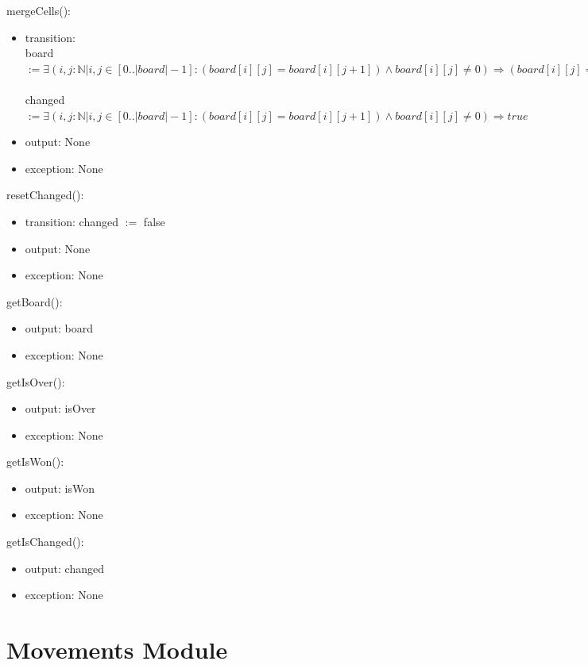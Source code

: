\documentclass[12pt]{article}
\begin{document}
\noindent mergeCells():
\begin{itemize}
    \item transition: \\ board $:= \exists (i, j: \mathbb{N} | i, j \in [0..|board|-1] : (board[i][j] = board[i][j + 1]) \wedge board[i][j] \neq 0) \Rightarrow (board[i][j] = board[i][j] * 2) \wedge (board[i][j + 1] = 0))$ \\\\
    changed $:= \exists (i, j: \mathbb{N} | i, j \in [0..|board|-1] : (board[i][j] = board[i][j + 1]) \wedge board[i][j] \neq 0) \Rightarrow true$
    \item output: None 
    \item exception: None
\end{itemize}

\noindent resetChanged():
\begin{itemize}
    \item transition: changed $:=$ false
    \item output: None 
    \item exception: None
\end{itemize}

\noindent getBoard():
\begin{itemize}
    \item output: board
    \item exception: None
\end{itemize}

\noindent getIsOver():
\begin{itemize}
    \item output: isOver
    \item exception: None
\end{itemize}

\noindent getIsWon():
\begin{itemize}
    \item output: isWon
    \item exception: None
\end{itemize}

\noindent getIsChanged():
\begin{itemize}
    \item output: changed
    \item exception: None
\end{itemize}

\newpage

\section* {Movements Module}
\end{document}
